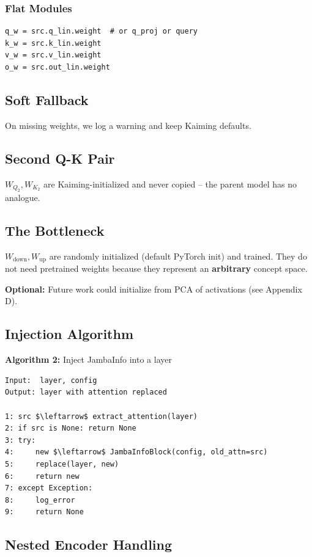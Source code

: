 \subsubsection{Flat Modules}

\begin{lstlisting}
q_w = src.q_lin.weight  # or q_proj or query
k_w = src.k_lin.weight
v_w = src.v_lin.weight
o_w = src.out_lin.weight
\end{lstlisting}

\subsection{Soft Fallback}

On missing weights, we log a warning and keep Kaiming defaults.

\subsection{Second Q-K Pair}

$W_{Q_2}, W_{K_2}$ are Kaiming-initialized and never copied -- the parent 
model has no analogue.

\subsection{The Bottleneck}

$W_\text{down}, W_\text{up}$ are randomly initialized (default PyTorch 
init) and trained. They do not need pretrained weights because they 
represent an \textbf{arbitrary} concept space.

\textbf{Optional:} Future work could initialize from PCA of activations (see 
Appendix D).

\subsection{Injection Algorithm}

\textbf{Algorithm 2:} Inject JambaInfo into a layer
\begin{lstlisting}
Input:  layer, config
Output: layer with attention replaced

1: src $\leftarrow$ extract_attention(layer)
2: if src is None: return None
3: try:
4:     new $\leftarrow$ JambaInfoBlock(config, old_attn=src)
5:     replace(layer, new)
6:     return new
7: except Exception:
8:     log_error
9:     return None
\end{lstlisting}

\subsection{Nested Encoder Handling}

